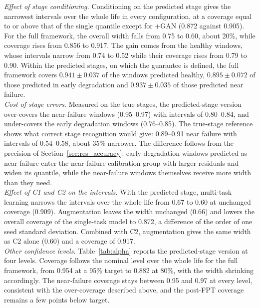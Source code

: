 \textit{Effect of stage conditioning.} Conditioning on the predicted
stage gives the narrowest intervals over the whole life in every
configuration, at a coverage equal to or above that of the single
quantile except for +GAN (0.872 against 0.905). For the full framework, the overall width falls from 0.75 to
0.60, about 20\%, while coverage rises from 0.856 to 0.917. The gain
comes from the healthy windows, whose intervals narrow from 0.74 to
0.52 while their coverage rises from 0.79 to 0.90. Within the predicted
stages, on which the guarantee is defined, the full framework covers
$0.941 \pm 0.037$ of the windows predicted healthy,
$0.895 \pm 0.072$ of those predicted in early degradation and
$0.937 \pm 0.035$ of those predicted near failure.\\

\textit{Cost of stage errors.} Measured on the true stages, the
predicted-stage version over-covers the near-failure windows
(0.95--0.97) with intervals of 0.80--0.84, and under-covers the early
degradation windows (0.76--0.85). The true-stage reference shows what
correct stage recognition would give: 0.89--0.91 near failure with
intervals of 0.54--0.58, about 35\% narrower. The difference follows
from the precision of Section~\ref{sec:res_accuracy}: early-degradation
windows predicted as near-failure enter the near-failure calibration
group with larger residuals and widen its quantile, while the
near-failure windows themselves receive more width than they need.\\

\textit{Effect of C1 and C2 on the intervals.} With the predicted
stage, multi-task learning narrows the intervals over the whole life
from 0.67 to 0.60 at unchanged coverage (0.909). Augmentation leaves
the width unchanged (0.66) and lowers the overall coverage of the
single-task model to 0.872, a difference of the order of one seed
standard deviation. Combined with C2, augmentation gives the same
width as C2 alone (0.60) and a coverage of 0.917.\\

\textit{Other confidence levels.} Table~\ref{tab:alpha} reports the
predicted-stage version at four levels. Coverage follows the nominal
level over the whole life for the full framework, from 0.954 at a 95\%
target to 0.882 at 80\%, with the width shrinking accordingly. The
near-failure coverage stays between 0.95 and 0.97 at every level,
consistent with the over-coverage described above, and the post-FPT
coverage remains a few points below target.

